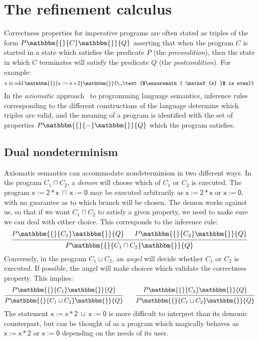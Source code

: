 \documentclass[draft,11pt]{report}
\theoremstyle{definition}
\newcommand{\kw}[1]{\ensuremath{ \mathsf{#1} }}
\newcommand{\htr}[3]{{ {#1} \mathbbm{\{} {#2} \mathbbm{\}} {#3} }}
\begin{document}


\section{The refinement calculus} %


Correctness properties for imperative programs
are often stated as triples of the form $\htr{P}{C}{Q}$
asserting that
when the program $C$ is started in a state which
satisfies the predicate $P$ (the \emph{precondition}),
then the state in which $C$ terminates
will satisfy the predicate $Q$ (the \emph{postcondition}).
For example:
\[
    \htr{\text{$\kw{x}$ is odd}\,}{\kw{x := x * 2}}{\,\text{$\kw{x}$ is even}}
\]
In the \emph{axiomatic} approach~\citep{hoare69} to programming language semantics,
inference rules
corresponding to the different constructions of the language
determine which triples are valid,
and the meaning of a program is identified with
the set of properties $\htr{P}{-}{Q}$
which the program satisfies.

\subsection{Dual nondeterminism}

Axiomatic semantics
can accommodate nondeterminism in two different ways.
In the program $C_1 \sqcap C_2$,
a \emph{demon} will choose which of $C_1$ or $C_2$ is executed.
The program $\kw{x := 2 * x} \: \sqcap \: \kw{x := 0}$
may be executed arbitrarily as $\kw{x := 2 * x}$ or $\kw{x := 0}$,
with no guarantee as to which branch will be chosen.
The demon works against us,
so that if we want $C_1 \sqcap C_2$ to satisfy a given property,
we need to make sure we can deal with either choice.
This corresponds to the inference rule:
\[
  \begin{prooftree}
    \hypo{\htr{P}{C_1}{Q}}
    \hypo{\htr{P}{C_2}{Q}}
    \infer2{\htr{P}{C_1 \sqcap C_2}{Q}}
  \end{prooftree}
\]
Conversely,
in the program $C_1 \sqcup C_2$,
an \emph{angel} will decide whether $C_1$ or $C_2$ is executed.
If possible,
the angel will make choices which validate
the correctness property.
This implies:
\[
  \begin{prooftree}
    \hypo{\htr{P}{C_1}{Q}}
    \infer1{\htr{P}{C_1 \sqcup C_2}{Q}}
  \end{prooftree}
  \qquad
  \begin{prooftree}
    \hypo{\htr{P}{C_2}{Q}}
    \infer1{\htr{P}{C_1 \sqcup C_2}{Q}}
  \end{prooftree}
\]
The statement $\kw{x := x * 2} \: \sqcup \: \kw{x := 0}$
is more difficult to interpret than its demonic counterpart,
but can be thought of as a program which magically behaves as
$\kw{x := x * 2}$ or $\kw{x := 0}$
depending on the needs of its user.
\end{document}
